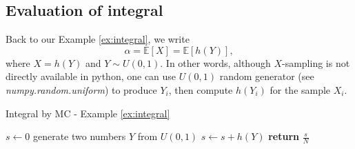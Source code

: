 \documentclass{article}
\begin{document}
\subsection{Evaluation of integral}
Back to our Example \ref{ex:integral}, we write
$$\alpha = \mathbb E[X] = \mathbb E[h(Y)],$$
where $X = h(Y)$ and $Y\sim U(0,1)$.
In other words, although $X$-sampling is not directly available in python, 
one can use $U(0,1)$ random generator (see {\it numpy.random.uniform}) to produce $Y_i$, then compute $h(Y_i)$ for 
the sample $X_i$.


\begin{algorithm}
\caption{Integral by MC - Example \ref{ex:integral}}
\label{alg:mcpi}
\begin{algorithmic}[1]
\State  $s \gets 0$ 
	\State generate two numbers $Y$ from $U(0,1)$ 
	\State $s\gets s+h(Y)$ 
\EndFor
\State \textbf{return} $\frac{s}{N}$ 
\EndProcedure
\end{algorithmic}
\end{algorithm}
\end{document}
